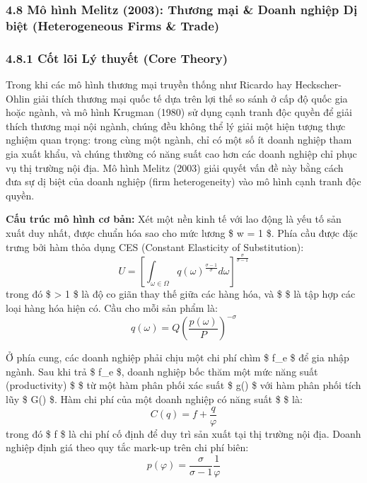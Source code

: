 \documentclass[
]{article}
\begin{document}
\subsubsection{4.8 Mô hình Melitz (2003): Thương mại \& Doanh nghiệp Dị
biệt (Heterogeneous Firms \&
Trade)}\label{muxf4-huxecnh-melitz-2003-thux1b0ux1a1ng-mux1ea1i-doanh-nghiux1ec7p-dux1ecb-biux1ec7t-heterogeneous-firms-trade}

\subsubsection{4.8.1 Cốt lõi Lý thuyết (Core
Theory)}\label{cux1ed1t-luxf5i-luxfd-thuyux1ebft-core-theory}

Trong khi các mô hình thương mại truyền thống như Ricardo hay
Heckscher-Ohlin giải thích thương mại quốc tế dựa trên lợi thế so sánh ở
cấp độ quốc gia hoặc ngành, và mô hình Krugman (1980) sử dụng cạnh tranh
độc quyền để giải thích thương mại nội ngành, chúng đều không thể lý
giải một hiện tượng thực nghiệm quan trọng: trong cùng một ngành, chỉ có
một số ít doanh nghiệp tham gia xuất khẩu, và chúng thường có năng suất
cao hơn các doanh nghiệp chỉ phục vụ thị trường nội địa. Mô hình Melitz
(2003) giải quyết vấn đề này bằng cách đưa sự dị biệt của doanh nghiệp
(firm heterogeneity) vào mô hình cạnh tranh độc quyền.

\textbf{Cấu trúc mô hình cơ bản:} Xét một nền kinh tế với lao động là
yếu tố sản xuất duy nhất, được chuẩn hóa sao cho mức lương \$ w = 1 \$.
Phía cầu được đặc trưng bởi hàm thỏa dụng CES (Constant Elasticity of
Substitution):
\[ U = \left[ \int_{\omega \in \Omega} q(\omega)^{\frac{\sigma-1}{\sigma}} d\omega \right]^{\frac{\sigma}{\sigma-1}} \]
trong đó \$ \sigma \textgreater{} 1 \$ là độ co giãn thay thế giữa các
hàng hóa, và \$ \Omega \$ là tập hợp các loại hàng hóa hiện có. Cầu cho
mỗi sản phẩm là:
\[ q(\omega) = Q \left( \frac{p(\omega)}{P} \right)^{-\sigma} \]

Ở phía cung, các doanh nghiệp phải chịu một chi phí chìm \$ f\_e \$ để
gia nhập ngành. Sau khi trả \$ f\_e \$, doanh nghiệp bốc thăm một mức
năng suất (productivity) \$ \varphi \$ từ một hàm phân phối xác suất \$
g(\varphi) \$ với hàm phân phối tích lũy \$ G(\varphi) \$. Hàm chi phí
của một doanh nghiệp có năng suất \$ \varphi \$ là:
\[ C(q) = f + \frac{q}{\varphi} \] trong đó \$ f \$ là chi phí cố định
để duy trì sản xuất tại thị trường nội địa. Doanh nghiệp định giá theo
quy tắc mark-up trên chi phí biên:
\[ p(\varphi) = \frac{\sigma}{\sigma-1} \frac{1}{\varphi} \]
\end{document}
